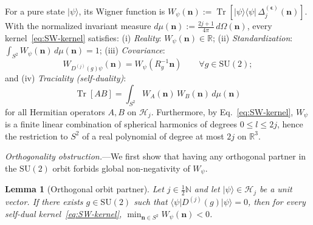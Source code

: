 \documentclass[aps,prl,reprint,amsmath,amssymb,nofootinbib,floatfix]{revtex4-2}
\newtheorem{lemma}{Lemma}
\newcommand{\ket}[1]{\lvert #1 \rangle}
\newcommand{\bra}[1]{\langle #1 \rvert}
\newcommand{\Tr}{\operatorname{Tr}}
\newcommand{\bn}{\mathbf{n}}
\begin{document}
For a pure state $\ket{\psi}$, its Wigner function is $W_\psi(\bn) := \Tr[\ket{\psi}\bra{\psi}\,\Delta_j^{(\boldsymbol{\epsilon})}(\bn)]$. With the normalized invariant measure $d\mu(\bn) := \frac{2j+1}{4\pi}\,d\Omega(\bn)$, every kernel~\eqref{eq:SW-kernel} satisfies:
(i) \emph{Reality}: $W_\psi(\bn) \in \mathbb{R}$;
(ii) \emph{Standardization}: $\int_{S^2} W_\psi(\bn)\,d\mu(\bn) = 1$;
(iii) \emph{Covariance}:
\begin{equation}\label{eq:covariance}
W_{D^{(j)}(g)\psi}(\bn) = W_\psi(R_g^{-1}\bn) \qquad \forall g \in \mathrm{SU}(2);
\end{equation}
and (iv) \emph{Traciality (self-duality)}:
\begin{equation}\label{eq:traciality}
\Tr[AB] = \int_{S^2} W_A(\bn)\,W_B(\bn)\,d\mu(\bn)
\end{equation}
for all Hermitian operators $A, B$ on $\mathcal{H}_j$. Furthermore, by Eq.~\eqref{eq:SW-kernel}, $W_\psi$ is a finite linear combination of spherical harmonics of degrees $0 \le l \le 2j$, hence the restriction to $S^2$ of a real polynomial of degree at most $2j$ on $\mathbb{R}^3$.

\emph{Orthogonality obstruction.}---We first show that having any orthogonal partner in the $\mathrm{SU}(2)$ orbit forbids global non-negativity of $W_\psi$.

\begin{lemma}[Orthogonal orbit partner]\label{lem:ortho-neg}
Let $j \in \frac{1}{2}\mathbb{N}$ and let $\ket{\psi} \in \mathcal{H}_j$ be a unit vector. If there exists $g \in \mathrm{SU}(2)$ such that $\bra{\psi} D^{(j)}(g) \ket{\psi} = 0$, then for every self-dual kernel~\eqref{eq:SW-kernel}, $\min_{\bn \in S^2} W_\psi(\bn) < 0$.
\end{lemma}
\end{document}
